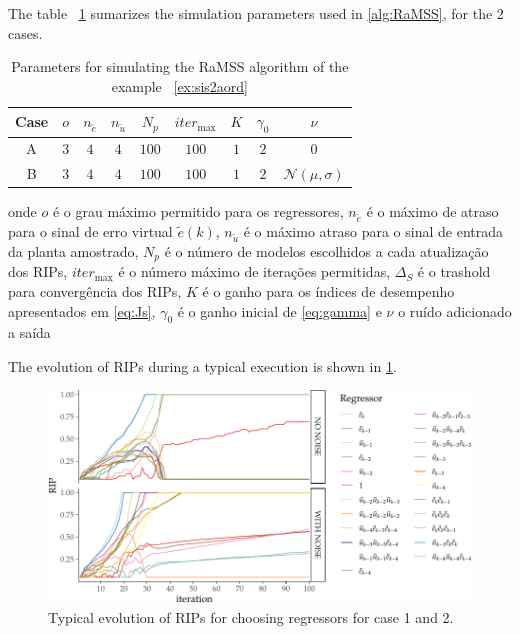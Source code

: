 \begin{exmp}
The table ~\ref{tab:exp51_param} sumarizes the simulation parameters used in \ref{alg:RaMSS}, for the 2 cases.
\begin{table}[htpb]
  \centering
  \caption{Parameters for simulating the RaMSS algorithm of the example ~\ref{ex:sis2aord}}\label{tab:exp51_param}
  \begin{tabular}{c|c|c|c|c|c|c|c|c}
    Case & $o$ & $n_{\tilde{e}}$ & $n_{\tilde{u}}$ & $ N_p$ & $ iter_{\max} $ & $K$ & $\gamma_0$  & $\nu$\\
    \hline
    A & $ 3 $ & $4$ & $4$ & $100$ & $100$ & $1$ & $2$ & $0$ \\
    B & $ 3 $ & $4$ & $4$ & $100$ & $100$ & $1$ & $2$ & $\mathcal{N}(\mu,\sigma)$
  \end{tabular}
\end{table}

onde  $o$ é o grau máximo permitido para os regressores, $n_{\tilde{e}}$ é o máximo de atraso para o sinal de erro virtual $\tilde{e}(k)$, $n_{\tilde{u}}$ é o máximo atraso para o sinal de entrada da planta amostrado,  $ N_p$ é o número de modelos escolhidos a cada atualização dos RIPs, $ iter_{\max} $ é o número máximo de iterações permitidas, $\Delta_S$ é o trashold para convergência dos RIPs, $K$ é o ganho para os índices de desempenho apresentados em \ref{eq:Js}, $\gamma_0$ é o ganho inicial de \ref{eq:gamma} e  $\nu$ o ruído adicionado a saída\\

The evolution of RIPs during a typical execution is shown in \ref{fig:ex51_RIPevol_2cases}.
\begin{figure}[H]
  \centering
  \includegraphics[width=\textwidth]{Figs/Cap5/ex51_rips_evol_2cases.tex.pdf}
  \caption{Typical evolution of RIPs for choosing regressors for case 1 and 2.}
  \label{fig:ex51_RIPevol_2cases}
\end{figure}



\end{exmp}
